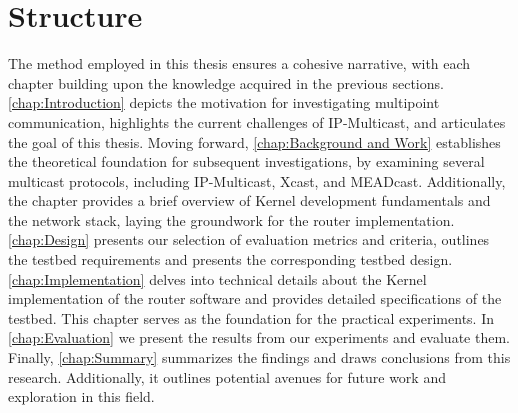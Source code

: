 \section{Structure} %
\label{sec:Structure}
The method employed in this thesis ensures a cohesive narrative, with each
    chapter building upon the knowledge acquired in the previous sections.
\autoref{chap:Introduction} depicts the motivation for investigating multipoint
    communication, highlights the current challenges of IP-Multicast, and
    articulates the goal of this thesis.
Moving forward, \autoref{chap:Background and Work} establishes the theoretical
    foundation for subsequent investigations, by examining several multicast
    protocols, including IP-Multicast, Xcast, and MEADcast.
Additionally, the chapter provides a brief overview of Kernel development
    fundamentals and the network stack, laying the groundwork for the router
    implementation.
\autoref{chap:Design} presents our selection of evaluation metrics and
    criteria, outlines the testbed requirements and presents the corresponding
    testbed design.
\autoref{chap:Implementation} delves into technical details about the Kernel
    implementation of the router software and provides detailed specifications
    of the testbed.
This chapter serves as the foundation for the practical experiments.
In \autoref{chap:Evaluation} we present the results from our experiments and
    evaluate them.
Finally, \autoref{chap:Summary} summarizes the findings and draws conclusions
    from this research.
Additionally, it outlines potential avenues for future work and exploration in
    this field.

